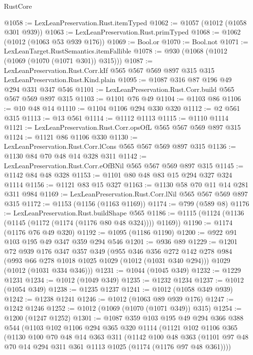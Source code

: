 \begin{lexlean}{RustCore}
\begin{coremodule}
@1058 := LexLeanPreservation.Rust.itemTyped
@1062 := @1057 (@1012 (@1058 @301 @939))
@1063 := LexLeanPreservation.Rust.primTyped
@1068 := @1062 (@1012 (@1063 @53 @939 @176))
@1069 := Bool.or
@1070 := Bool.not
@1071 := LexLeanTarget.RustSemantics.itemFallible
@1078 := @930 (@1068 (@1012 (@1069 (@1070 (@1071 @301)) @315)))
@1087 := LexLeanPreservation.Rust.Corr.kIf
    @565
    @567
    @569
    @897
    @315
    @315
    LexLeanPreservation.Rust.Kind.plain
@1095 := @1087 @316 @87 @196 @49 @294 @331 @347 @546
@1101 := LexLeanPreservation.Rust.Corr.build @565 @567 @569 @897 @315
@1103 := @1101 @76 @49
@1104 := @1103 @86
@1106 := @10 @48 @14
@1110 := @1104 @1106 @294 @330 @320
@1112 := @2 @561 @315
@1113 := @13 @561
@1114 := @1112 @1113
@1115 := @1110 @1114
@1121 := LexLeanPreservation.Rust.Corr.opsOfL @565 @567 @569 @897 @315
@1124 := @1121 @86 @1106 @330
@1130 := LexLeanPreservation.Rust.Corr.lCons @565 @567 @569 @897 @315
@1136 := @1130 @84 @70 @48 @14 @328 @311
@1142 := LexLeanPreservation.Rust.Corr.eOfBNil @565 @567 @569 @897 @315
@1145 := @1142 @84 @48 @328
@1153 := @1101 @80 @48 @83 @15 @294 @327 @324 @1114
@1156 := @1121 @83 @15 @327
@1163 := @1130 @58 @70 @11 @14 @281 @311 @984
@1169 := LexLeanPreservation.Rust.Corr.lNil @565 @567 @569 @897 @315
@1172 := @1153 (@1156 (@1163 @1169))
@1174 := @799 (@589 @8)
@1176 := LexLeanPreservation.Rust.buildShape @565
@1186 := @1115 (@1124 (@1136 (@1145 (@1172 (@1174 (@1176 @80 @48 @324)))) @1169))
@1190 := @1174 (@1176 @76 @49 @320)
@1192 := @1095 (@1186 @1190)
@1200 := @922 @91 @103 @195 @49 @347 @359 @294 @546
@1201 := @936 @89
@1229 := @1201
    @72
    @939
    @176
    @347
    @357
    @349
    (@955
      @346
      @356
      @272
      @142
      @278
      @984
      (@993 @66 @278 @1018 @1025 @1029 (@1012 (@1031 @340 @294)))
      @1029
      (@1012 (@1031 @334 @346)))
@1231 := @1044 (@1045 @349)
@1232 := @1229 @1231
@1234 := @1012 (@1049 @349)
@1235 := @1232 @1234
@1237 := @1012 (@1054 @349)
@1238 := @1235 @1237
@1241 := @1012 (@1058 @349 @939)
@1242 := @1238 @1241
@1246 := @1012 (@1063 @89 @939 @176)
@1247 := @1242 @1246
@1252 := @1012 (@1069 (@1070 (@1071 @349)) @315)
@1254 := @1200 (@1247 @1252)
@1301 := @1087
    @359
    @103
    @195
    @49
    @294
    @366
    @388
    @544
    (@1103
      @102
      @1106
      @294
      @365
      @320
      @1114
      (@1121
        @102
        @1106
        @365
        (@1130
          @100
          @70
          @48
          @14
          @363
          @311
          (@1142
            @100
            @48
            @363
            (@1101 @97 @48 @70 @14 @294 @311 @361 @1113 @1025 (@1174 (@1176 @97 @48 @361))))

\end{coremodule}
\end{lexlean}
